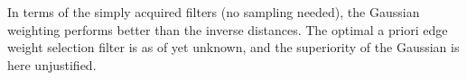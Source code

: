 \documentclass[12pt,a4paper]{article} %
\begin{document}
In terms of the simply acquired filters (no sampling needed), the Gaussian weighting performs better than the inverse distances. The optimal a priori edge weight selection filter is as of yet unknown, and the superiority of the Gaussian is here unjustified.

\end{document}

